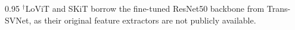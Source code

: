 \begin{table}[t]
\vspace{6pt}
\begin{spacing}{0.95}
\footnotesize
$^\dagger$LoViT and SKiT borrow the fine-tuned ResNet50 backbone from Trans-SVNet, as their original feature extractors are not publicly available.
\end{spacing}
\end{table}
